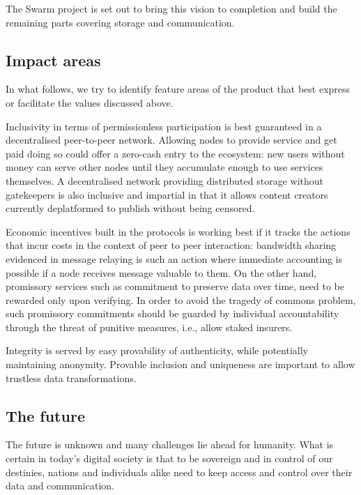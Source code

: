 The Swarm project is set out to bring this vision to completion and build the remaining parts covering storage and communication. 

\subsection{Impact areas \statusorange}

In what follows, we try to identify feature areas of the product that best express or facilitate the values discussed above. 

Inclusivity in terms of permissionless participation is best guaranteed in a decentralised peer-to-peer network.  
Allowing nodes to provide service and get paid doing so could offer a zero-cash entry to the ecosystem: new users without money can serve other nodes until they accumulate enough to use services themselves. A decentralised network providing distributed storage without gatekeepers is also inclusive and impartial in that it allows content creators currently deplatformed to publish without being censored. 

Economic incentives built in the protocols is working best if it tracks the actions that incur costs in the context of peer to peer interaction: bandwidth sharing evidenced in message relaying is such an action where immediate accounting is possible if a node receives message valuable to them. On the other hand, promissory services such as commitment to preserve data over time, need to be rewarded only upon verifying. In order to avoid the tragedy of commons problem, such promissory commitments should be guarded by individual accountability through the threat of punitive measures, i.e., allow staked insurers.

Integrity is served by easy provability of authenticity, while potentially maintaining anonymity.
Provable inclusion and uniqueness are important to allow trustless data transformations.


\subsection{The future} \label{sec:future}

The future is unknown and many challenges lie ahead for humanity. What is certain in today's digital society is that to be sovereign and in control of our destinies, nations and individuals alike need to keep access and control over their data and communication.

